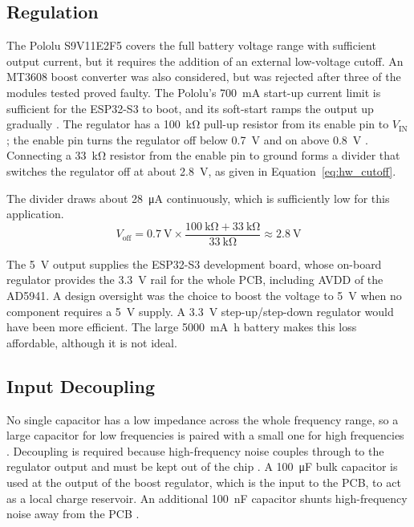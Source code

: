 \subsection{Regulation}
\label{sec:hw_regulation}

The Pololu S9V11E2F5 covers the full battery voltage range with sufficient
output current, but it requires the addition of an external low-voltage
cutoff. An MT3608 boost converter was also considered, but was rejected after three of the modules tested proved faulty. The Pololu's \SI{700}{\milli\ampere} start-up current limit is sufficient for
the ESP32-S3 to boot, and its soft-start ramps the output up gradually
\cite{pololu_s9v11e2f5}. The regulator has a \SI{100}{\kilo\ohm} pull-up
resistor from its enable pin to $V_\text{IN}$; the enable pin turns the
regulator off below \SI{0.7}{\volt} and on above \SI{0.8}{\volt}
\cite{pololu_s9v11e2f5}. Connecting a \SI{33}{\kilo\ohm} resistor from the
enable pin to ground forms a divider that switches the regulator off at about \SI{2.8}{\volt}, as given in Equation~\eqref{eq:hw_cutoff}.

The divider draws about \SI{28}{\micro\ampere} continuously, which is
sufficiently low for this application.
\begin{equation}
  V_\text{off} = \SI{0.7}{\volt} \times
    \frac{\SI{100}{\kilo\ohm} + \SI{33}{\kilo\ohm}}{\SI{33}{\kilo\ohm}}
    \approx \SI{2.8}{\volt}
  \label{eq:hw_cutoff}
\end{equation}

The \SI{5}{\volt} output supplies the ESP32-S3 development board, whose on-board regulator provides the \SI{3.3}{\volt} rail for the whole PCB, including AVDD of the AD5941.
A design oversight was the choice to boost the voltage to \SI{5}{\volt} when
no component requires a \SI{5}{\volt} supply. A \SI{3.3}{\volt}
step-up/step-down regulator would have been more efficient. The large
\SI{5000}{\milli\ampere\hour} battery makes this loss affordable, although it
is not ideal.

\subsection{Input Decoupling}
\label{sec:hw_input_decoupling}

No single capacitor has a low impedance across the whole frequency range, so a
large capacitor for low frequencies is paired with a small one for high
frequencies \cite{adi_mt101}. Decoupling is required because high-frequency
noise couples through to the regulator output and must be kept out of the chip
\cite{adi_mt101}. A \SI{100}{\micro\farad} bulk capacitor is used at the
output of the boost regulator, which is the input to the PCB, to act as a
local charge reservoir. An additional \SI{100}{\nano\farad} capacitor shunts
high-frequency noise away from the PCB \cite{adi_mt101}.

